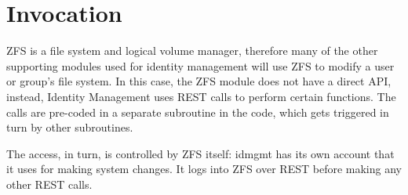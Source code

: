 \section{Invocation}

ZFS is a file system and logical volume manager, therefore many of the other supporting modules used for identity management will use ZFS to modify a user or group's file system. In this case, the ZFS module does not have a direct API, instead, Identity Management uses REST calls to perform certain functions. The calls are pre-coded in a separate subroutine in the code, which gets triggered in turn by other subroutines.  

The access, in turn, is controlled by ZFS itself: idmgmt has its own account that it uses for making system changes. It logs into ZFS over REST before making any other REST calls. 
